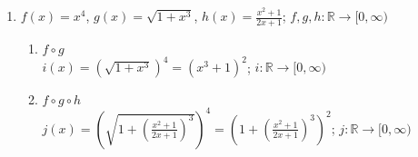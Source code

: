 \documentclass{article}
\begin{document}
\begin{enumerate}
    \item $f(x) = x^4$, $g(x) = \sqrt{1+x^3}$, $h(x) = \frac{x^2 + 1}{2x + 1}$;
    $f,g,h : \mathbb{R} \rightarrow [0, \infty)$

    \begin{enumerate}
        \item $f \circ g$ \\ $i(x) = (\sqrt{1+x^3})^4 = (x^3 + 1)^2$; $i :
        \mathbb{R} \rightarrow [0, \infty)$

        \item $f \circ g \circ h$ \\ $j(x) =
        \left(\sqrt{1 +(\frac{x^2 + 1}{2x + 1})^3}\right)^4 =
        \left(1 + (\frac{x^2 + 1}{2x + 1})^3\right)^2$; $j :
        \mathbb{R} \rightarrow [0, \infty)$
    \end{enumerate}
\end{enumerate}

\newpage
\end{document}
